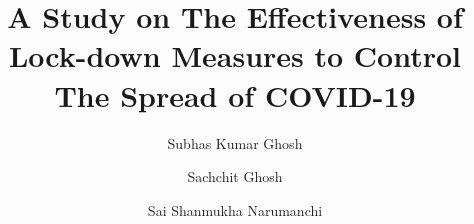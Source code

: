 \documentclass[preprint,authoryear,12pt]{elsarticle}
\begin{document}
	
	\begin{frontmatter}
		
		
		
		\title{A Study on The Effectiveness of Lock-down Measures to Control The Spread of COVID-19}
		
		
		\author[a1]{Subhas Kumar Ghosh}
		\author[a2]{Sachchit Ghosh}
		\author[a3]{Sai Shanmukha Narumanchi}
	
		
		\address[a1]{Commonwealth Bank of Australia, Sydney, New South Wales, 2000, Australia}
		\address[a2]{The University of Sydney, Camperdown, NSW 2006, Australia}
		\address[a3]{Department of Computer Science, Southern Illinois University, Carbondale, IL 62901, USA.}
	

\end{frontmatter}
\end{document}
